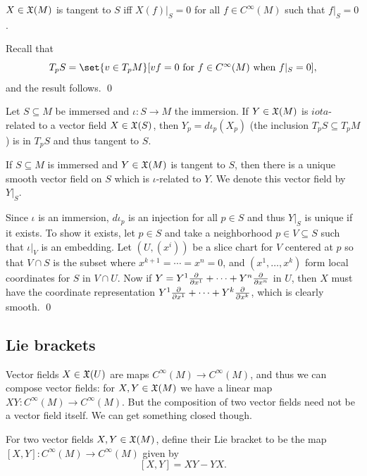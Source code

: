 \bprop

    $X\in{\frak X}(M)$ is tangent to $S$ iff $X(f)|_S=0$ for all $f\in C^\infty(M)$ such that $f|_S=0$.

\eprop

\bproof

    Recall that
    $$ T_pS = \set{v\in T_pM}[vf=0\hbox{ for $f\in C^\infty(M)$ when $f|_S=0$}] , $$
    and the result follows.
    \qed

\eproof

Let $S\subseteq M$ be immersed and $\iota\colon S\to M$ the immersion.
If $Y\in{\frak X}(M)$ is $iota$-related to a vector field $X\in{\frak X}(S)$, then $Y_p=d\iota_p(X_p)$ (the inclusion $T_pS\subseteq T_pM$) is in $T_pS$
and thus tangent to $S$.

\bprop

    If $S\subseteq M$ is immersed and $Y\in{\frak X}(M)$ is tangent to $S$, then there is a unique smooth vector field on $S$ which is
    $\iota$-related to $Y$.
    We denote this vector field by $Y|_S$.

\eprop

\bproof

    Since $\iota$ is an immersion, $d\iota_p$ is an injection for all $p\in S$ and thus $Y|_S$ is unique if it exists.
    To show it exists, let $p\in S$ and take a neighborhood $p\in V\subseteq S$ such that $\iota|_V$ is an embedding.
    Let $(U,(x^i))$ be a slice chart for $V$ centered at $p$ so that $V\cap S$ is the subset where $x^{k+1}=\cdots=x^n=0$,
    and $(x^1,\dots,x^k)$ form local coordinates for $S$ in $V\cap U$.
    Now if $Y=Y^1{{\partial }\over{\partial x^1}}+\cdots+Y^n{{\partial }\over{\partial x^n}}$ in $U$, then $X$ must have the coordinate representation $Y^1{{\partial }\over{\partial x^1}}+\cdots+Y^k{{\partial }\over{\partial x^k}}$,
    which is clearly smooth.
    \qed

\eproof

\subsection{Lie brackets}

Vector fields $X\in{\frak X}(U)$ are maps $C^\infty(M)\to C^\infty(M)$, and thus we can compose vector fields: for $X,Y\in{\frak X}(M)$ we have a linear map
$XY\colon C^\infty(M)\to C^\infty(M)$.
But the composition of two vector fields need not be a vector field itself.
We can get something closed though.

\bdefn

    For two vector fields $X,Y\in{\frak X}(M)$, define their {\emphcolor Lie bracket} to be the map $[X,Y]\colon C^\infty(M)\to C^\infty(M)$ given by
    $$ [X,Y] = XY - YX . $$

